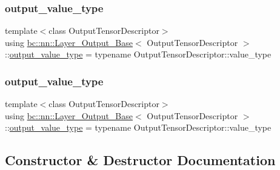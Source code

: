 \subsubsection{\texorpdfstring{output\+\_\+value\+\_\+type}{output\_value\_type}\hspace{0.1cm}{\footnotesize\ttfamily [1/2]}}
{\footnotesize\ttfamily template$<$class Output\+Tensor\+Descriptor$>$ \\
using \hyperlink{structbc_1_1nn_1_1Layer__Output__Base}{bc\+::nn\+::\+Layer\+\_\+\+Output\+\_\+\+Base}$<$ Output\+Tensor\+Descriptor $>$\+::\hyperlink{structbc_1_1nn_1_1Layer__Output__Base_acbef11226ebb0a194a319630a4f3c871}{output\+\_\+value\+\_\+type} =  typename Output\+Tensor\+Descriptor\+::value\+\_\+type}

\mbox{\label{structbc_1_1nn_1_1Layer__Output__Base_acbef11226ebb0a194a319630a4f3c871}} 
\subsubsection{\texorpdfstring{output\+\_\+value\+\_\+type}{output\_value\_type}\hspace{0.1cm}{\footnotesize\ttfamily [2/2]}}
{\footnotesize\ttfamily template$<$class Output\+Tensor\+Descriptor$>$ \\
using \hyperlink{structbc_1_1nn_1_1Layer__Output__Base}{bc\+::nn\+::\+Layer\+\_\+\+Output\+\_\+\+Base}$<$ Output\+Tensor\+Descriptor $>$\+::\hyperlink{structbc_1_1nn_1_1Layer__Output__Base_acbef11226ebb0a194a319630a4f3c871}{output\+\_\+value\+\_\+type} =  typename Output\+Tensor\+Descriptor\+::value\+\_\+type}



\subsection{Constructor \& Destructor Documentation}
\mbox{\label{structbc_1_1nn_1_1Layer__Output__Base_a4ac27a579c01108c3ed2a7a95010382b}} 

